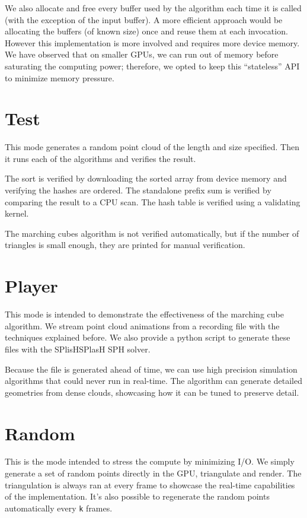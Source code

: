 \documentclass[a4paper]{report}
\begin{document}
We also allocate and free every buffer used by the algorithm each time it is called (with the exception of the input buffer). A more efficient approach would be allocating the buffers (of known size) once and reuse them at each invocation. However this implementation is more involved and requires more device memory. We have observed that on smaller GPUs, we can run out of memory before saturating the computing power; therefore, we opted to keep this ``stateless'' API to minimize memory pressure.

\section{Test}

This mode generates a random point cloud of the length and size specified. Then it runs each of the algorithms and verifies the result.

The sort is verified by downloading the sorted array from device memory and verifying the hashes are ordered. The standalone prefix sum is verified by comparing the result to a CPU scan. The hash table is verified using a validating kernel.

The marching cubes algorithm is not verified automatically, but if the number of triangles is small enough, they are printed for manual verification.

\section{Player}

This mode is intended to demonstrate the effectiveness of the marching cube algorithm. We stream point cloud animations from a recording file with the techniques explained before. We also provide a python script to generate these files with the SPlisHSPlasH \cite{SPlisHSPlasH_Library} SPH solver.

Because the file is generated ahead of time, we can use high precision simulation algorithms that could never run in real-time. The algorithm can generate detailed geometries from dense clouds, showcasing how it can be tuned to preserve detail.

\section{Random}

This is the mode intended to stress the compute by minimizing I/O. We simply generate a set of random points directly in the GPU, triangulate and render. The triangulation is always ran at every frame to showcase the real-time capabilities of the implementation. It's also possible to regenerate the random points automatically every \lstinline{k} frames.



\end{document}
